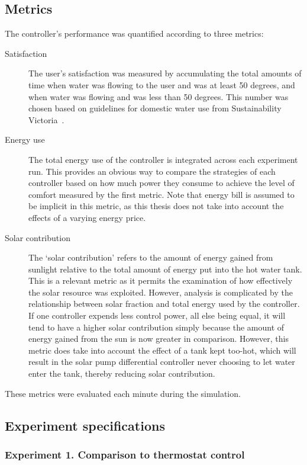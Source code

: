 \subsection{Metrics}

The controller's performance was quantified according to three metrics:

\begin{description}
   \item[Satisfaction]
      The user's satisfaction was measured by accumulating the total amounts of time when water was flowing to the user and was at least 50 degrees, and when water was flowing and was less than 50 degrees.
      This number was chosen based on guidelines for domestic water use from Sustainability Victoria~\cite{LSTS}.
   \item[Energy use]
      The total energy use of the controller is integrated across each experiment run.
      This provides an obvious way to compare the strategies of each controller based on how much power they consume to achieve the level of comfort measured by the first metric.
      Note that energy bill is assumed to be implicit in this metric, as this thesis does not take into account the effects of a varying energy price.
   \item[Solar contribution]
      The `solar contribution' refers to the amount of energy gained from sunlight relative to the total amount of energy put into the hot water tank.
      This is a relevant metric as it permits the examination of how effectively the solar resource was exploited.
      However, analysis is complicated by the relationship between solar fraction and total energy used by the controller.
      If one controller expends less control power, all else being equal, it will tend to have a higher solar contribution simply because the amount of energy gained from the sun is now greater in comparison.
      However, this metric does take into account the effect of a tank kept too-hot, which will result in the solar pump differential controller never choosing to let water enter the tank, thereby reducing solar contribution.
\end{description}

These metrics were evaluated each minute during the simulation.

\subsection{Experiment specifications}

\subsubsection{Experiment 1. Comparison to thermostat control}

